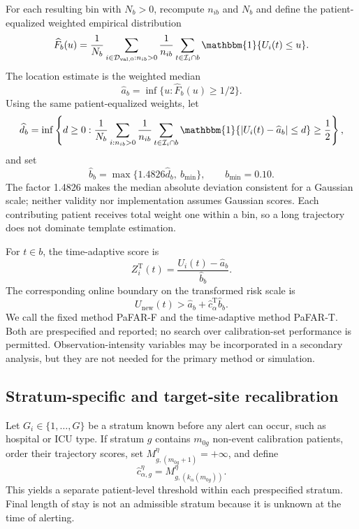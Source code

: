 \documentclass[11pt]{article}
\newcommand{\Ind}{\mathbbm{1}}
\newcommand{\calD}{\mathcal{D}}
\newcommand{\calI}{\mathcal{I}}
\begin{document}
For each resulting bin with $N_b>0$, recompute $n_{ib}$ and $N_b$ and define the patient-equalized weighted empirical distribution
\begin{equation}
\widehat F_b(u)=\frac{1}{N_b}
\sum_{i\in\calD_{\mathrm{val},0}:n_{ib}>0}
\frac{1}{n_{ib}}\sum_{t\in\calI_i\cap b}\Ind\{U_i(t)\le u\}.
\label{eq:weighted-cdf}
\end{equation}
The location estimate is the weighted median
\[
\widehat a_b=\inf\{u:\widehat F_b(u)\ge1/2\}.
\]
Using the same patient-equalized weights, let
\begin{equation}
\widehat d_b=
\inf\left\{d\ge0:
\frac{1}{N_b}
\sum_{i:n_{ib}>0}\frac{1}{n_{ib}}
\sum_{t\in\calI_i\cap b}
\Ind\{|U_i(t)-\widehat a_b|\le d\}\ge\frac12
\right\},
\label{eq:weighted-mad}
\end{equation}
and set
\begin{equation}
\widehat b_b=\max\{1.4826\widehat d_b,\ b_{\min}\},
\qquad b_{\min}=0.10.
\label{eq:scale-floor}
\end{equation}
The factor 1.4826 makes the median absolute deviation consistent for a Gaussian scale; neither validity nor implementation assumes Gaussian scores. Each contributing patient receives total weight one within a bin, so a long trajectory does not dominate template estimation.

For $t\in b$, the time-adaptive score is
\begin{equation}
Z_i^{\mathrm{T}}(t)=
\frac{U_i(t)-\widehat a_b}{\widehat b_b}.
\label{eq:time-adaptive-score}
\end{equation}
The corresponding online boundary on the transformed risk scale is
\begin{equation}
U_{\mathrm{new}}(t)>
\widehat a_b+\widehat c_{\alpha}^{\mathrm{T}}\widehat b_b.
\label{eq:adaptive-boundary}
\end{equation}
We call the fixed method PaFAR-F and the time-adaptive method PaFAR-T. Both are prespecified and reported; no search over calibration-set performance is permitted. Observation-intensity variables may be incorporated in a secondary analysis, but they are not needed for the primary method or simulation.

\subsection{Stratum-specific and target-site recalibration}

Let $G_i\in\{1,\ldots,G\}$ be a stratum known before any alert can occur, such as hospital or ICU type. If stratum $g$ contains $m_{0g}$ non-event calibration patients, order their trajectory scores, set $M_{g,(m_{0g}+1)}^{\eta}=+\infty$, and define
\begin{equation}
\widehat c_{\alpha,g}^{\eta}
=M_{g,(k_{\alpha}(m_{0g}))}^{\eta}.
\label{eq:stratum-threshold}
\end{equation}
This yields a separate patient-level threshold within each prespecified stratum. Final length of stay is not an admissible stratum because it is unknown at the time of alerting.
\end{document}
